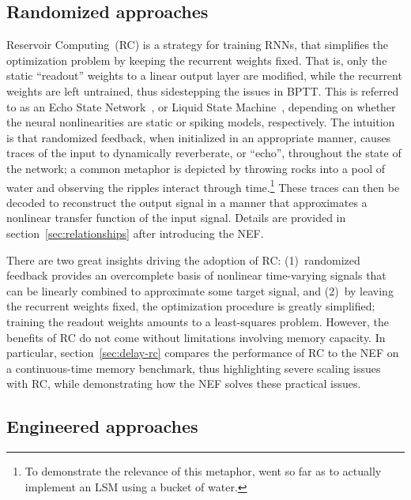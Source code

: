 \subsection{Randomized approaches}

Reservoir Computing~(RC) is a strategy for training RNNs, that simplifies the optimization problem by keeping the recurrent weights fixed.
That is, only the static ``readout'' weights to a linear output layer are modified, while the recurrent weights are left untrained, thus sidestepping the issues in BPTT.
This is referred to as an Echo State Network~\citep[ESN;][]{jaeger2001echo}, or Liquid State Machine~\citep[LSM;][]{maass2002real}, depending on whether the neural nonlinearities are static or spiking models, respectively.
The intuition is that randomized feedback, when initialized in an appropriate manner, causes traces of the input to dynamically reverberate, or ``echo'', throughout the state of the network; a common metaphor is depicted by throwing rocks into a pool of water and observing the ripples interact through time.\footnote{To demonstrate the relevance of this metaphor, \citet{fernando2003pattern} went so far as to actually implement an LSM using a bucket of water.}
These traces can then be decoded to reconstruct the output signal in a manner that approximates a nonlinear transfer function of the input signal.
Details are provided in section~\ref{sec:relationships} after introducing the NEF.

There are two great insights driving the adoption of RC: (1)~randomized feedback provides an overcomplete basis of nonlinear time-varying signals that can be linearly combined to approximate some target signal, and (2)~by leaving the recurrent weights fixed, the optimization procedure is greatly simplified; training the readout weights amounts to a least-squares problem.
However, the benefits of RC do not come without limitations involving memory capacity. 
In particular, section~\ref{sec:delay-rc} compares the performance of RC to the NEF on a continuous-time memory benchmark, thus highlighting severe scaling issues with RC, while demonstrating how the NEF solves these practical issues.

\subsection{Engineered approaches}

